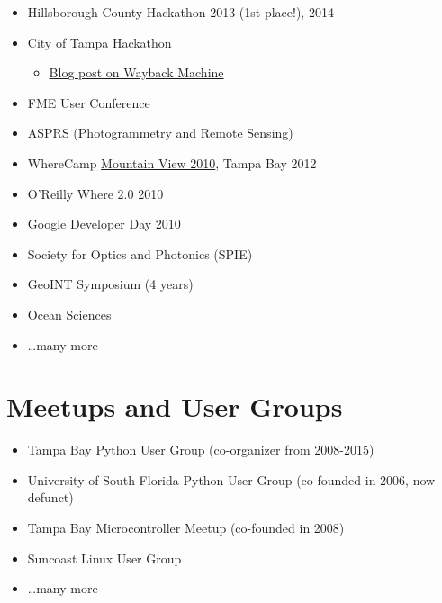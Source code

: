 \documentclass[12pt]{article}
\newenvironment{mitemize}
               {%
                 \setlength{\parskip}{3pt}
                 \setlength{\itemsep}{2.5pt plus 1pt}
                 \begin{itemize}}
               {\end{itemize}}
\begin{document}
\begin{mitemize}
    \begin{mitemize}
    \item Tampa, Sarasota 2011, Orlando, Portland,  \ldots
    \end{mitemize}
  \item Hillsborough County Hackathon 2013 (1st place!), 2014
  \item City of Tampa Hackathon
    \begin{mitemize}
    \item \href{https://web.archive.org/web/20120808120046/http://www.weogeo.com/blog/City_of_Tampa_Mayors_Hackathon.html}{Blog post on Wayback Machine}
    \end{mitemize}
  \item FME User Conference
  \item ASPRS (Photogrammetry and Remote Sensing)
  \item WhereCamp \href{https://conferences.oreilly.com/where/where2010/public/schedule/detail/14268}{Mountain View 2010}, Tampa Bay 2012
  \item O'Reilly Where 2.0 2010
  \item Google Developer Day 2010
  \item Society for Optics and Photonics (SPIE)
  \item GeoINT Symposium (4 years)
  \item Ocean Sciences
  \item \ldots many more
\end{mitemize}

\section*{Meetups and User Groups} \hfill

\begin{mitemize}
\item Tampa Bay Python User Group (co-organizer from 2008-2015)
\item University of South Florida Python User Group (co-founded in 2006, now defunct)
\item Tampa Bay Microcontroller Meetup (co-founded in 2008)
\item Suncoast Linux User Group
\item \ldots many more
\end{mitemize}
\end{document}
